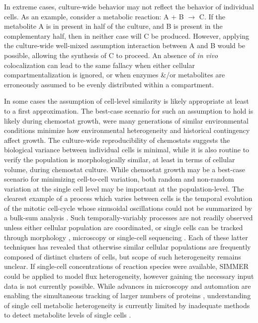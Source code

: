In extreme cases, culture-wide behavior may not reflect the behavior of individual cells. As an example, consider a metabolic reaction: A + B $\rightarrow$ C. If the metabolite A is in present in half of the culture, and B is present in the complementary half, then in neither case will C be produced. However, applying the culture-wide well-mixed assumption interaction between A and B would be possible, allowing the synthesis of C to proceed. An absence of \textit{in vivo} colocalization can lead to the same fallacy when either cellular compartmentalization is ignored, or when enzymes \&/or metabolites are erroneously assumed to be evenly distributed within a compartment.

In some cases the assumption of cell-level similarity is likely appropriate at least to a first approximation. The best-case scenario for such an assumption to hold is likely during chemostat growth, were many generations of similar environmental conditions minimize how environmental heterogeneity and historical contingency affect growth. The culture-wide reproducibility of chemostats suggests the biological variance between individual cells is minimal, while it is also routine to verify the population is morphologically similar, at least in terms of cellular volume, during chemostat culture. While chemostat growth may be a best-case scenario for minimizing cell-to-cell variation, both random \cite{BarEven:2006dz, Kaern:2005gr} and non-random variation at the single cell level may be important at the population-level. The clearest example of a process which varies between cells is the temporal evolution of the mitotic cell-cycle whose sinusoidal oscillations could not be summarized by a bulk-sum analysis \cite{Hartwell:1974uy, Spellman:1998wj}. Such temporally-variably processes are not readily observed unless either cellular population are coordinated\cite{Hartwell:1974uy, Tu:2006cl}, or single cells can be tracked through morphology \cite{Herskowitz:1988ut}, microscopy \cite{Venturelli:2015ec} or single-cell sequencing \cite{Patel:2014dt}. Each of these latter techniques has revealed that otherwise similar cellular populations are frequently composed of distinct clusters of cells, but scope of such heterogeneity remains unclear. If single-cell concentrations of reaction species were available, SIMMER could be applied to model flux heterogeneity, however gaining the necessary input data is not currently possible. While advances in microscopy and automation are enabling the simultaneous tracking of larger numbers of proteins \cite{Ghaemmaghami:2003ds, Dubuis:2013cw}, understanding of single cell metabolic heterogeneity is currently limited by inadequate methods to detect metabolite levels of single cells \cite{Zenobi:2013il}.




